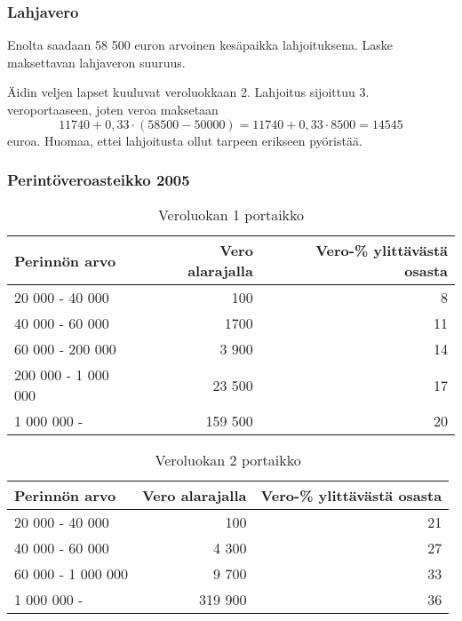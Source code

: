 \documentclass{beamer}
\begin{document}
\begin{frame}
	\frametitle{Lahjavero}
	\pause
	\begin{esim}
		Enolta saadaan 58 500 euron arvoinen kesäpaikka lahjoituksena. Laske maksettavan lahjaveron suuruus.
	\end{esim}
	\pause
	\begin{ratkaisu}
		\pause Äidin veljen lapset kuuluvat veroluokkaan 2. \pause Lahjoitus sijoittuu 3. veroportaaseen, joten veroa maksetaan \pause
		\[
			11740 + 0,33\cdot(58500-50000) = 11740 + 0,33\cdot8500 = 14545
		\]
		euroa. \pause Huomaa, ettei lahjoitusta ollut tarpeen erikseen pyöristää.
	\end{ratkaisu}
\end{frame}

\begin{frame}
	\frametitle{Perintöveroasteikko 2005}
	\begin{table}[h]
\begin{tabular}{|lrr|}
\hline
Perinnön arvo      & Vero alarajalla & Vero-\% ylittävästä osasta \\ \hline
20 000 - 40 000     & 100             & 8                               \\
40 000 - 60 000     & 1700            & 11                              \\
60 000 - 200 000    & 3 900           & 14                              \\
200 000 - 1 000 000 & 23 500          & 17                              \\
1 000 000 -         & 159 500               & 20  \\
\hline         
\end{tabular}
\caption{Veroluokan 1 portaikko}
\end{table}

\begin{table}[h]
\begin{tabular}{|lrr|}
\hline
Perinnön arvo        & Vero alarajalla & Vero-\% ylittävästä osasta \\ \hline
20 000 - 40 000    & 100             & 21                               \\
40 000 - 60 000    & 4 300           & 27                               \\
60 000 - 1 000 000 & 9 700           & 33                               \\
1 000 000 -        & 319 900         & 36     \\
\hline                           
\end{tabular}
\caption{Veroluokan 2 portaikko}
\end{table}

\end{frame}
\end{document}
